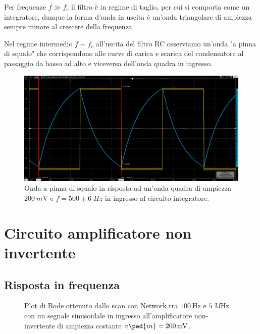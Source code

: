 \documentclass[10pt,a4paper]{article}
\begin{document}
Per frequenze $f \gg f_c$ il filtro è in regime di taglio, per cui si comporta
come un integratore, dunque la forma d'onda in uscita è un'onda triangolare di
ampiezza sempre minore al crescere della frequenza.

Nel regime intermedio $f \sim f_c$ all'uscita del filtro RC osserviamo un'onda
"a pinna di squalo" che corrispondono alle curve di carica e scarica del
condensatore al passaggio da basso ad alto e viceversa dell'onda quadra in
ingresso.
\begin{figure}[htbp]
\centering
\includegraphics[scale=0.335]{intfin}
\caption{Onda a pinna di squalo in risposta ad un'onda quadra di ampiezza
$\SI{200}{m\V}$ e $f = 500 \pm 6 \; \si{Hz}$ in ingresso al circuito
integratore. \label{fig: intfin}}
\end{figure}

\section{Circuito amplificatore non invertente}
\subsection{Risposta in frequenza}

\begin{figure}[htbp]
\centering
\caption{Plot di Bode ottenuto dallo scan con Network tra $\SI{100}{\Hz}$ e
$\SI{5}{M\Hz}$ con un segnale sinusoidale in ingresso all'amplificatore
non-invertente di ampiezza costante $v\ped{in} = \SI{200}{m\V}$.
\label{fig: ampbode}}
\end{figure}
\end{document}
